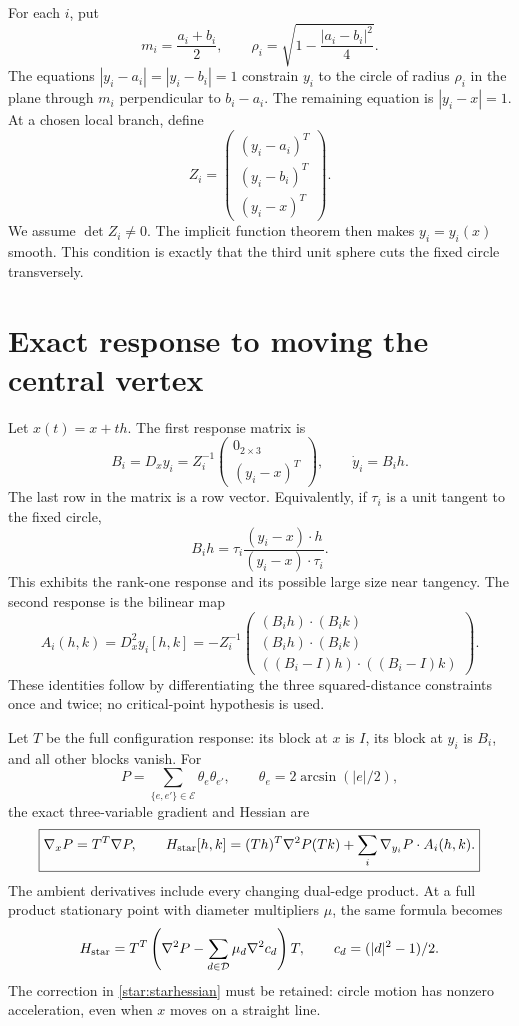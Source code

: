 \documentclass[11pt]{article}
\theoremstyle{remark}\newtheorem{remark}[theorem]{Remark}
\begin{document}
For each $i$, put
\[
 m_i=\frac{a_i+b_i}{2},\qquad
 \rho_i=\sqrt{1-\frac{|a_i-b_i|^2}{4}}.
\]
The equations $|y_i-a_i|=|y_i-b_i|=1$ constrain $y_i$ to the circle
of radius $\rho_i$ in the plane through $m_i$ perpendicular to
$b_i-a_i$. The remaining equation is $|y_i-x|=1$.
At a chosen local branch, define
\[
 Z_i=\begin{pmatrix}
 (y_i-a_i)^T\\ (y_i-b_i)^T\\ (y_i-x)^T
 \end{pmatrix}.
\]
We assume $\det Z_i\ne0$. The implicit function theorem then makes
$y_i=y_i(x)$ smooth. This condition is exactly that the third unit
sphere cuts the fixed circle transversely.

\section{Exact response to moving the central vertex}
Let $x(t)=x+th$. The first response matrix is
\begin{equation}\label{star:response}
 B_i=D_xy_i
 =Z_i^{-1}\begin{pmatrix}0_{2\times3}\\(y_i-x)^T\end{pmatrix},
 \qquad \dot y_i=B_i h.
\end{equation}
The last row in the matrix is a row vector. Equivalently, if $\tau_i$
is a unit tangent to the fixed circle,
\[
 B_i h=\tau_i\frac{(y_i-x)\cdot h}{(y_i-x)\cdot\tau_i}.
\]
This exhibits the rank-one response and its possible large size near
tangency. The second response is the bilinear map
\begin{equation}\label{star:acceleration}
 A_i(h,k)=D_x^2y_i[h,k]
 =-Z_i^{-1}\begin{pmatrix}
 (B_i h)\cdot(B_i k)\\
 (B_i h)\cdot(B_i k)\\
 ((B_i-I)h)\cdot((B_i-I)k)
 \end{pmatrix}.
\end{equation}
These identities follow by differentiating the three squared-distance
constraints once and twice; no critical-point hypothesis is used.

Let $T$ be the full configuration response: its block at $x$ is $I$,
its block at $y_i$ is $B_i$, and all other blocks vanish. For
\[
 P=\sum_{\{e,e'\}\in\mathcal E}\theta_e\theta_{e'},
 \qquad \theta_e=2\arcsin(|e|/2),
\]
the exact three-variable gradient and Hessian are
\begin{equation}\label{star:starhessian}
 \boxed{\nabla_x P=T^T\nabla P,\qquad
 H_{\rm star}[h,k]=(Th)^T\nabla^2P(Tk)
 +\sum_i\nabla_{y_i}P\cdot A_i(h,k).}
\end{equation}
The ambient derivatives include every changing dual-edge product.
At a full product stationary point with diameter multipliers $\mu$,
the same formula becomes
\[
 H_{\rm star}=T^T\left(\nabla^2P-
                  \sum_{d\in\mathcal D}\mu_d\nabla^2c_d\right)T,
 \qquad c_d=(|d|^2-1)/2.
\]
The correction in \eqref{star:starhessian} must be retained: circle motion
has nonzero acceleration, even when $x$ moves on a straight line.
\end{document}
